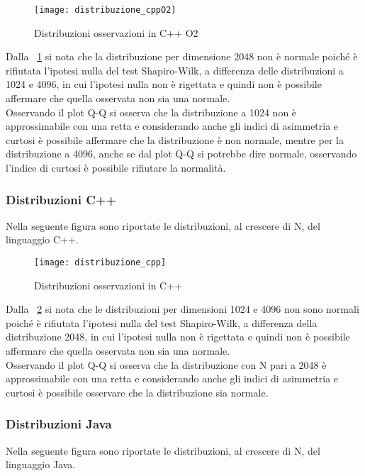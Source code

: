 \begin{figure}[!htbp]
  \texttt{[image: distribuzione\_cppO2]}
  \caption{Distribuzioni osservazioni in C++ O2}
  \label{distribuzione_cppO2}
\end{figure}
Dalla \figurename~\ref{distribuzione_cppO2} si nota
che la distribuzione per dimensione 2048 non è normale poiché è rifiutata
l'ipotesi nulla del test Shapiro-Wilk, a differenza delle distribuzioni a 1024 e 4096,
in cui l'ipotesi nulla non è rigettata e quindi non è possibile affermare che
quella osservata non sia una normale.\\
Osservando il plot Q-Q si osserva che la distribuzione a 1024 non è approssimabile con una
retta e considerando anche gli indici di asimmetria e curtosi è possibile affermare che
la distribuzione è non normale, mentre per la distribuzione a 4096, anche se dal plot
Q-Q si potrebbe dire normale, osservando l'indice di curtosi è possibile rifiutare
la normalità.
\clearpage
\subsubsection{Distribuzioni C++ }
Nella seguente figura sono riportate le distribuzioni, al crescere di N, del
linguaggio C++.

\begin{figure}[!htbp]
  \texttt{[image: distribuzione\_cpp]}
  \caption{Distribuzioni osservazioni in C++}
  \label{distribuzione_cpp}
\end{figure}

Dalla \figurename~\ref{distribuzione_cpp} si nota
che le distribuzioni per dimensioni 1024 e 4096 non sono normali poiché è rifiutata
l'ipotesi nulla del test Shapiro-Wilk, a differenza della distribuzione 2048,
in cui l'ipotesi nulla non è rigettata e quindi non è possibile affermare
che quella osservata non sia una normale.\\
Osservando il plot Q-Q si osserva che la distribuzione con N pari a 2048 è approssimabile con una
retta e considerando anche gli indici di asimmetria e curtosi è possibile osservare che
la distribuzione sia normale.\\
\clearpage
\subsubsection{Distribuzioni Java}
Nella seguente figura sono riportate le distribuzioni, al crescere di N, del
linguaggio Java.

